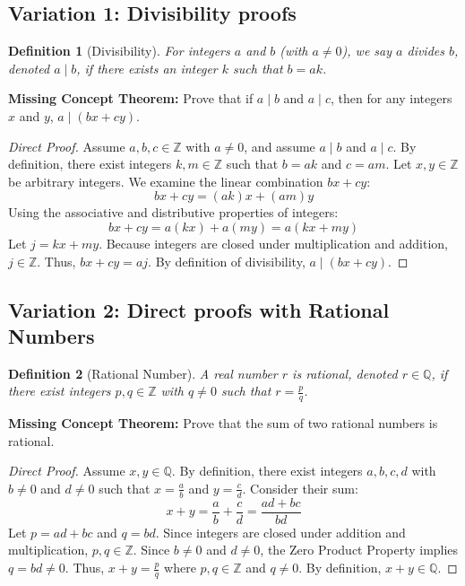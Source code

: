 \documentclass[11pt]{article}
\newtheorem{definition}{Definition}[section]
\theoremstyle{remark}
\begin{document}
\subsection{Variation 1: Divisibility proofs}
\begin{definition}[Divisibility]
For integers $a$ and $b$ (with $a \neq 0$), we say $a$ divides $b$, denoted $a \mid b$, if there exists an integer $k$ such that $b = ak$.
\end{definition}

\textbf{Missing Concept Theorem:} Prove that if $a \mid b$ and $a \mid c$, then for any integers $x$ and $y$, $a \mid (bx + cy)$.
\begin{proof}[Direct Proof]
Assume $a, b, c \in \mathbb{Z}$ with $a \neq 0$, and assume $a \mid b$ and $a \mid c$. 
By definition, there exist integers $k, m \in \mathbb{Z}$ such that $b = ak$ and $c = am$. 
Let $x, y \in \mathbb{Z}$ be arbitrary integers. We examine the linear combination $bx + cy$:
\[ bx + cy = (ak)x + (am)y \]
Using the associative and distributive properties of integers:
\[ bx + cy = a(kx) + a(my) = a(kx + my) \]
Let $j = kx + my$. Because integers are closed under multiplication and addition, $j \in \mathbb{Z}$. 
Thus, $bx + cy = aj$. By definition of divisibility, $a \mid (bx + cy)$.
\end{proof}

\subsection{Variation 2: Direct proofs with Rational Numbers}
\begin{definition}[Rational Number]
A real number $r$ is rational, denoted $r \in \mathbb{Q}$, if there exist integers $p, q \in \mathbb{Z}$ with $q \neq 0$ such that $r = \frac{p}{q}$.
\end{definition}
\textbf{Missing Concept Theorem:} Prove that the sum of two rational numbers is rational.
\begin{proof}[Direct Proof]
Assume $x, y \in \mathbb{Q}$. By definition, there exist integers $a, b, c, d$ with $b \neq 0$ and $d \neq 0$ such that $x = \frac{a}{b}$ and $y = \frac{c}{d}$.
Consider their sum:
\[ x + y = \frac{a}{b} + \frac{c}{d} = \frac{ad + bc}{bd} \]
Let $p = ad + bc$ and $q = bd$. Since integers are closed under addition and multiplication, $p, q \in \mathbb{Z}$. 
Since $b \neq 0$ and $d \neq 0$, the Zero Product Property implies $q = bd \neq 0$.
Thus, $x + y = \frac{p}{q}$ where $p,q \in \mathbb{Z}$ and $q \neq 0$. By definition, $x + y \in \mathbb{Q}$.
\end{proof}
\end{document}
